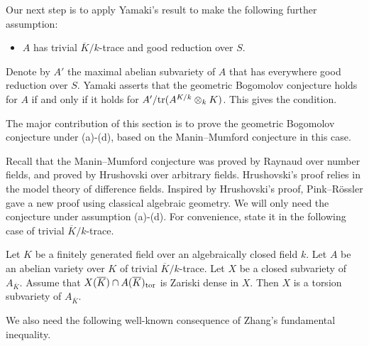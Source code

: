 \documentclass[12pt]{amsart}
\begin{document}
Our next step is to apply Yamaki's result to make the following further assumption:
\begin{itemize}
\item[(d)] $A$ has trivial $\overline K/k$-trace and good reduction over $S$. 
\end{itemize} 
Denote by $A'$ the maximal abelian subvariety of $A$ that has everywhere good reduction over $S$. 
Yamaki \cite[Theorem 1.5]{Yamaki2016a} asserts that the geometric Bogomolov conjecture holds for $A$ if and only if it holds for $A'/{\rm tr}(A^{K/k}\otimes_kK)$. 
This gives the condition. 

The major contribution of this section is to prove the geometric Bogomolov conjecture
under (a)-(d), based on the Manin--Mumford conjecture in this case. 

Recall that the Manin--Mumford conjecture was proved by Raynaud \cite{Raynaud1983,Raynaud1983a} over number fields, and proved by Hrushovski \cite{Hrushovski2001} over arbitrary fields.  Hrushovski's proof relies in the model theory of difference fields. Inspired by Hrushovski's proof, Pink--R\"ossler \cite{Pink2002a,Pink2004} gave a new proof using classical algebraic geometry. We will only need the conjecture under assumption (a)-(d). 
For convenience, state it in the following case of trivial $\overline K/k$-trace.

\begin{thm} \label{MM}
Let $K$ be a finitely generated field over an algebraically closed field $k$. Let $A$ be an abelian variety over $K$ of trivial $\overline K/ k$-trace.
Let $X$ be a closed subvariety of $A_{\overline K}$. 
Assume that $X(\overline K)\cap A(\overline K)_{\mathrm{tor}}$ is Zariski dense in $X$. 
Then $X$ is a torsion subvariety of $A_{\overline K}$. 
\end{thm}

We also need the following well-known consequence of Zhang's fundamental inequality.
\end{document}
